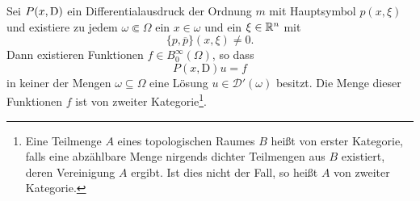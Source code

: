 \begin{cor}\label{thm:2_hoer}
Sei $P(x,\mathrm D)$ ein Differentialausdruck der Ordnung $m$ mit  Hauptsymbol $p(x,\xi)$ und existiere zu jedem $\omega\Subset\Omega$ 
ein $x\in\omega$ und ein $\xi\in\mathbb R^n$ mit
\begin{equation}
 \{p,\overline p\}(x,\xi)\ne 0.
\end{equation}
Dann existieren Funktionen $f\in B_0^\infty(\Omega)$, so dass
\begin{equation}\label{lewy:pxDu=f}
P(x,\mathrm D)u=f
\end{equation}
in keiner der Mengen $\omega\subseteq\Omega$ eine Lösung $u\in\mathscr D'(\omega)$ besitzt. Die Menge dieser Funktionen $f$ ist von zweiter Kategorie\footnote{Eine Teilmenge $A$ eines topologischen Raumes $B$ heißt von erster Kategorie, falls eine abzählbare Menge nirgends dichter Teilmengen aus $B$ existiert, deren Vereinigung $A$ ergibt. Ist dies nicht der Fall, so heißt $A$ von zweiter Kategorie.}.
\end{cor}

